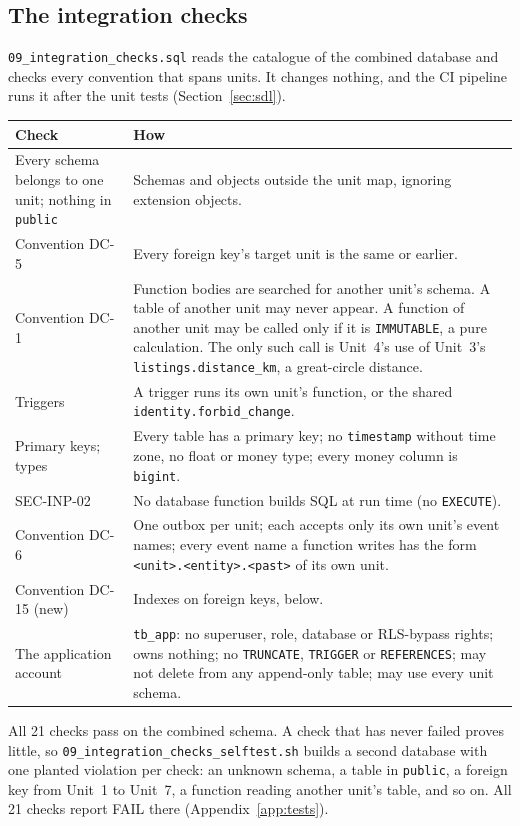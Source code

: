 \documentclass[11pt,a4paper]{article}
\newenvironment{dtable}[1]{\small\begin{longtable}{#1}}{\end{longtable}}
\begin{document}
\subsection{The integration checks}
\label{sec:checks}
\texttt{09\_\allowbreak integration\_\allowbreak checks.\allowbreak sql} reads the catalogue of the combined database and checks every convention that spans units. It changes nothing, and the CI pipeline runs it after the unit tests (Section~\ref{sec:sdl}).
\begin{dtable}{@{}>{\raggedright\arraybackslash}p{6.4cm}>{\raggedright\arraybackslash}p{8.8cm}@{}}
\toprule
\textbf{Check} & \textbf{How} \\ \midrule \endhead
Every schema belongs to one unit; nothing in \texttt{public} & Schemas and objects outside the unit map, ignoring extension objects. \\
Convention DC-5 & Every foreign key's target unit is the same or earlier. \\
Convention DC-1 & Function bodies are searched for another unit's schema. A table of another unit may never appear. A function of another unit may be called only if it is \texttt{IMMUTABLE}, a pure calculation. The only such call is Unit~4's use of Unit~3's \texttt{listings.\allowbreak distance\_\allowbreak km}, a great-circle distance. \\
Triggers & A trigger runs its own unit's function, or the shared \texttt{identity.\allowbreak forbid\_\allowbreak change}. \\
Primary keys; types & Every table has a primary key; no \texttt{timestamp} without time zone, no float or money type; every money column is \texttt{bigint}. \\
SEC-INP-02 & No database function builds SQL at run time (no \texttt{EXECUTE}). \\
Convention DC-6 & One outbox per unit; each accepts only its own unit's event names; every event name a function writes has the form \texttt{<unit>.<entity>.<past>} of its own unit. \\
Convention DC-15 (new) & Indexes on foreign keys, below. \\
The application account & \texttt{tb\_app}: no superuser, role, database or RLS-bypass rights; owns nothing; no \texttt{TRUNCATE}, \texttt{TRIGGER} or \texttt{REFERENCES}; may not delete from any append-only table; may use every unit schema. \\
\bottomrule
\end{dtable}
All 21 checks pass on the combined schema. A check that has never failed proves little, so \texttt{09\_\allowbreak integration\_\allowbreak checks\_\allowbreak selftest.\allowbreak sh} builds a second database with one planted violation per check: an unknown schema, a table in \texttt{public}, a foreign key from Unit~1 to Unit~7, a function reading another unit's table, and so on. All 21 checks report FAIL there (Appendix~\ref{app:tests}).
\end{document}
